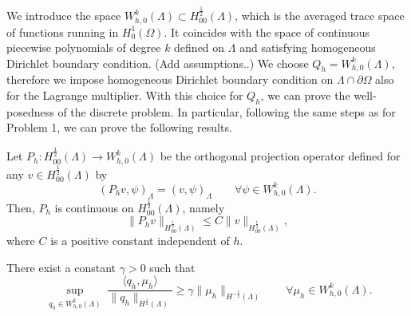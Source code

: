 We introduce the space
$W_{h,0}^k(\Lambda) \subset H^{\frac 12} _{00} (\Lambda)$, which is the averaged trace space of functions running in $H^1_0(\Omega)$. It coincides with the space of continuous piecewise polynomials of degree $k$ defined on $\Lambda$ and satisfying homogeneous Dirichlet boundary condition. {\color{red} (Add assumptions..)}
We choose $Q_h=W_{h,0}^k(\Lambda)$, therefore we impose homogeneous Dirichlet boundary condition on $\Lambda \cap \partial \Omega$ also for the Lagrange multiplier. With this choice for $Q_h$, we can prove the well-posedness of the discrete problem. In particular, following the same steps as for Problem 1, we can prove the following results.
\begin{lemma}
Let $P_h: H^{\frac 12}_{00}(\Lambda) \longrightarrow W_{h,0}^k(\Lambda)$ be the orthogonal projection operator defined  for any $v \in H^{\frac 12}_{00}(\Lambda)$ by
\begin{equation*}
(P_h v , \psi)_\Lambda= (v, \psi)_\Lambda \qquad \forall \psi \in W_{h,0}^k(\Lambda).  
\end{equation*} 
Then, $P_h$ is continuous on $H^{\frac 12}_{00}(\Lambda)$, namely
\begin{equation*}
\|P_h v\|_{H^{\frac 12}_{00}(\Lambda)} \leq C \|v\|_{H^{\frac 12}_{00}(\Lambda)},
\end{equation*}
where $C$ is a positive constant independent of $h$.
\end{lemma}

\begin{lemma}\label{infsup_avr_trspace}
There exist a constant $\gamma >0$ such that
\begin{equation*}
\sup_{\substack{q_h \in W_{h,0}^k(\Lambda)}} \frac{\langle q_h , \mu_h \rangle}{ \|q_h\|_{H^{\frac 12}(\Lambda)}} \geq \gamma \|\mu_h\|_{H^{-\frac 12}(\Lambda)} \qquad \forall \mu_h \in W_{h,0}^k(\Lambda).
\end{equation*} 
\end{lemma}


